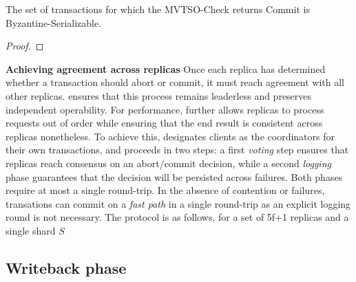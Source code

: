 \begin{theorem}
The set of transactions for which the MVTSO-Check returns Commit is Byzantine-Serializable. 
\end{theorem}
\begin{proof}
\end{proof}

\par \textbf{Achieving agreement across replicas} Once each replica has determined whether a transaction should abort or commit, it must reach agreement with all other replicas. \sys{} ensures that this process remains leaderless and preserves independent operability. For performance, \sys{} further allows replicas to process requests out of order while ensuring that the end result is consistent across replicas nonetheless. To achieve this, \sys{} designates clients as the
coordinators for their own transactions, and proceeds in two steps: a first \textit{voting} step ensures that replicas reach consensus on an abort/commit decision, while a second \textit{logging} phase guarantees that the decision will be persisted across failures. Both phases require at most a single round-trip. In the absence of contention or failures, transations can commit on a \textit{fast path} in a single round-trip as an explicit logging round is not
necessary. The protocol is as follows, for a set of 5f+1 replicas and a single shard $S$ 

\subsection{Writeback phase}
